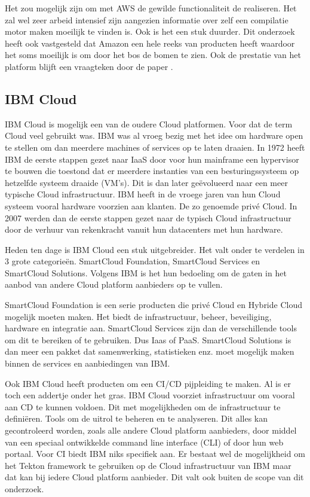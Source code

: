 Het zou mogelijk zijn om met AWS de gewilde functionaliteit de realiseren. Het zal wel zeer arbeid intensief zijn aangezien informatie over zelf een compilatie motor maken moeilijk te vinden is. Ook is het een stuk duurder. Dit onderzoek heeft ook vastgesteld dat Amazon een hele reeks van producten heeft waardoor het soms moeilijk is om door het bos de bomen te zien. Ook de prestatie van het platform blijft een vraagteken door de paper \autocite{Jackson2010}.

\subsection{IBM Cloud}
IBM Cloud is mogelijk een van de oudere Cloud platformen. Voor dat de term Cloud veel gebruikt was. IBM was al vroeg bezig met het idee om hardware open te stellen om dan meerdere machines of services op te laten draaien. In 1972 heeft IBM de eerste stappen gezet naar IaaS door voor hun mainframe een hypervisor te bouwen die toestond dat er meerdere instanties van een besturingssysteem op hetzelfde systeem draaide (VM’s). Dit is dan later geëvolueerd naar een meer typische Cloud infrastructuur. IBM heeft in de vroege jaren van hun Cloud systeem vooral hardware voorzien aan klanten. De zo genoemde privé Cloud. In 2007 werden dan de eerste stappen gezet naar de typisch Cloud infrastructuur door de verhuur van rekenkracht vanuit hun datacenters met hun hardware. 

Heden ten dage is IBM Cloud een stuk uitgebreider. Het valt onder te verdelen in 3 grote categorieën. SmartCloud Foundation, SmartCloud Services en SmartCloud Solutions. Volgens IBM is het hun bedoeling om de gaten in het aanbod van andere Cloud platform aanbieders op te vullen.

SmartCloud Foundation is een serie producten die privé Cloud en Hybride Cloud mogelijk moeten maken. Het biedt de infrastructuur, beheer, beveiliging, hardware en integratie aan. SmartCloud Services zijn dan de verschillende tools om dit te bereiken of te gebruiken. Dus Iaas of PaaS. SmartCloud Solutions is dan meer een pakket dat samenwerking, statistieken enz. moet mogelijk maken binnen de services en aanbiedingen van IBM.

Ook IBM Cloud heeft producten om een CI/CD pijpleiding te maken. Al is er toch een addertje onder het gras. IBM Cloud voorziet infrastructuur om vooral aan CD te kunnen voldoen. Dit met mogelijkheden om de infrastructuur te definiëren. Tools om de uitrol te beheren en te analyseren. Dit alles kan gecontroleerd worden, zoals alle andere Cloud platform aanbieders, door middel van een speciaal ontwikkelde command line interface (CLI) of door hun web portaal. Voor CI biedt IBM niks specifiek aan. Er bestaat wel de mogelijkheid om het Tekton framework te gebruiken op de Cloud infrastructuur van IBM maar dat kan bij iedere Cloud platform aanbieder. Dit valt ook buiten de scope van dit onderzoek.


